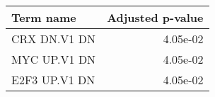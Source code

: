 \begin{tabular}{lr}
\toprule
    Term name &  Adjusted p-value \\
\midrule
 CRX DN.V1 DN &          4.05e-02 \\
 MYC UP.V1 DN &          4.05e-02 \\
E2F3 UP.V1 DN &          4.05e-02 \\
\bottomrule
\end{tabular}
